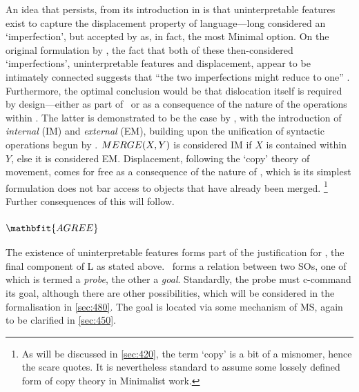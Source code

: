 An idea that persists, from its introduction in \textcite[ \textit{et seq.}]{ChomskyN_1995} is that uninterpretable features exist to capture the displacement property of language---long considered an `imperfection', but accepted by \textcite[note 29]{ChomskyN_2004} as, in fact, the most Minimal option. On the original formulation by \textcite{ChomskyN_2000}, the fact that both of these then-considered `imperfections', uninterpretable features and displacement, appear to be intimately connected suggests that ``the two imperfections might reduce to one'' \parencite[121]{ChomskyN_2000}. Furthermore, the optimal conclusion would be that dislocation itself is required by design---either as part of \IC\ or as a consequence of the nature of the operations within \CHL. The latter is demonstrated to be the case by \textcite{ChomskyN_2004}, with the introduction of \textit{internal \MERGE} (IM) and \textit{external \MERGE} (EM), building upon the unification of syntactic operations begun by \textcite{KitaharaH_1997}. $MERGE(X,Y)$ is considered IM if $X$ is contained within $Y$, else it is considered EM. Displacement, following the `copy' theory of movement, comes for free as a consequence of the nature of \MERGE, which is its simplest formulation does not bar access to objects that have already been merged.%
\footnote{As will be discussed in \autoref{sec:420}, the term `copy' is a bit of a misnomer, hence the scare quotes. It is nevertheless standard to assume some lossely defined form of copy theory in Minimalist work.}
Further consequences of this will follow.

\subsubsection[\AGREE]{$\mathbfit{\AGREE}$}\label{sec:144}

The existence of uninterpretable features forms part of the justification for \AGREE, the final component of L as stated above. \AGREE\ forms a relation between two SOs, one of which is termed a \textit{probe}, the other a \textit{goal}. Standardly, the probe must c-command its goal, although there are other possibilities, which will be considered in the formalisation in \autoref{sec:480}. The goal is located via some mechanism of MS, again to be clarified in \autoref{sec:450}.

